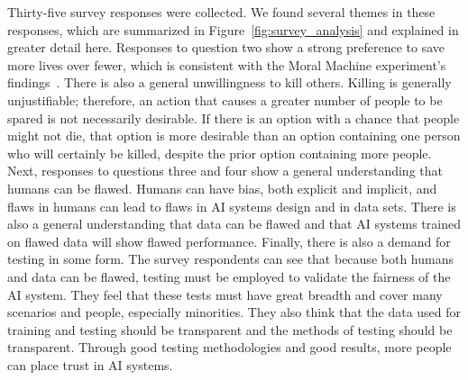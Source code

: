 \documentclass[]{report}
\begin{document}
Thirty-five survey responses were collected. We found several themes in these responses, which are
summarized in Figure~\ref{fig:survey_analysis} and explained in greater detail here. Responses to
question two show a strong preference to save more lives over fewer, which is consistent with the
Moral Machine experiment's findings~\cite{awad2018moral}. There is also a general unwillingness to
kill others. Killing is generally unjustifiable; therefore, an action that causes a greater number
of people to be spared is not necessarily desirable. If there is an option with a chance that people
might not die, that option is more desirable than an option containing one person who will certainly
be killed, despite the prior option containing more people. Next, responses to questions three and
four show a general understanding that humans can be flawed. Humans can have bias, both explicit and
implicit, and flaws in humans can lead to flaws in AI systems design and in data sets. There is also
a general understanding that data can be flawed and that AI systems trained on flawed data will show
flawed performance. Finally, there is also a demand for testing in some form. The survey respondents
can see that because both humans and data can be flawed, testing must be employed to validate the
fairness of the AI system. They feel that these tests must have great breadth and cover many
scenarios and people, especially minorities. They also think that the data used for training and
testing should be transparent and the methods of testing should be transparent. Through good testing
methodologies and good results, more people can place trust in AI systems.
\end{document}
